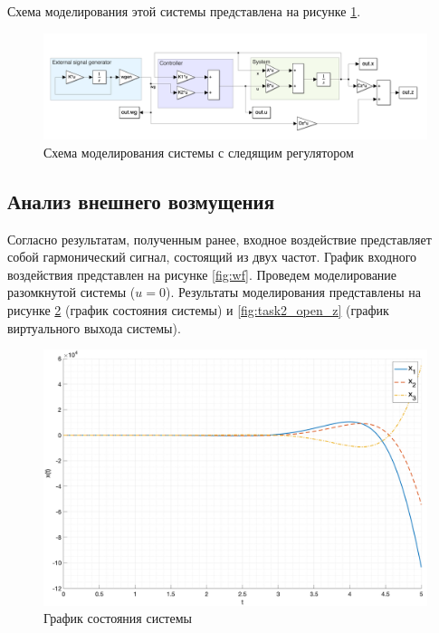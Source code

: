 Схема моделирования этой системы представлена на рисунке \ref{fig:scheme2}.
\begin{figure}[ht!]
    \centering
    \includegraphics[width=\textwidth]{media/scheme2.png}
    \caption{Схема моделирования системы с следящим регулятором}
    \label{fig:scheme2}
\end{figure}
\FloatBarrier
\subsection{Анализ внешнего возмущения}
Согласно результатам, полученным ранее, входное воздействие представляет собой 
гармонический сигнал, состоящий из двух частот. График входного воздействия
представлен на рисунке \ref{fig:wf}.
Проведем моделирование разомкнутой системы ($u = 0$). Результаты моделирования
представлены на рисунке \ref{fig:task2_open_x} (график состояния системы) и
\ref{fig:task2_open_z} (график виртуального выхода системы).
\begin{figure}[ht!]
    \centering
    \includegraphics[width=\textwidth]{media/plots/task2_open_x.png}
    \caption{График состояния системы}
    \label{fig:task2_open_x}
\end{figure}
